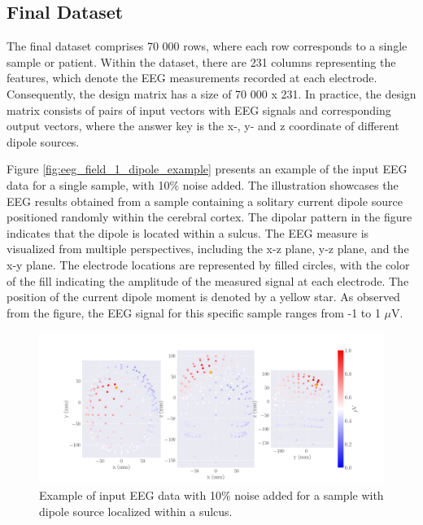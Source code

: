 \documentclass[a4paper, UKenglish, 11pt]{uiomaster}
\begin{document}
\subsection{Final Dataset}
The final dataset comprises 70 000 rows, where each row corresponds to a single sample or patient. Within the dataset, there are 231 columns representing the features, which denote the EEG measurements recorded at each electrode. Consequently, the design matrix has a size of 70 000 x 231. In practice, the design matrix consists of pairs of input vectors with EEG signals and corresponding output vectors, where the answer key is the x-, y- and z coordinate of different dipole sources.

Figure \ref{fig:eeg_field_1_dipole_example} presents an example of the input EEG data for a single sample, with 10$\%$ noise added. The illustration showcases the EEG results obtained from a sample containing a solitary current dipole source positioned randomly within the cerebral cortex. The dipolar pattern in the figure indicates that the dipole is located within a sulcus. The EEG measure is visualized from multiple perspectives, including the x-z plane, y-z plane, and the x-y plane. The electrode locations are represented by filled circles, with the color of the fill indicating the amplitude of the measured signal at each electrode. The position of the current dipole moment is denoted by a yellow star. As observed from the figure, the EEG signal for this specific sample ranges from -1 to 1 $\mu$V.

\begin{figure}[!htb]
    \centering
    \includegraphics[width=\linewidth]{figures/simple_dipole_eeg_field_noise_100.png}
    \caption{Example of input EEG data with 10$\%$ noise added for a sample with dipole source localized within a sulcus.}
    \label{fig:dipole_w_amplitude_example}
\end{figure}

\end{document}
